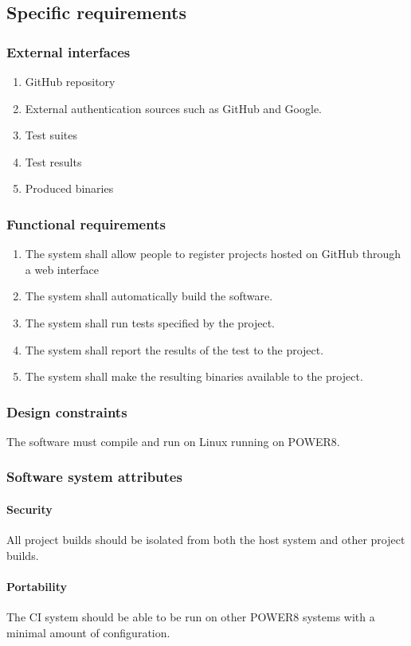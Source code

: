 \documentclass[10pt,letterpaper,onecolumn,draftclsnofoot]{IEEEtran}
\begin{document}
\subsection{Specific requirements}
\subsubsection{External interfaces}
\begin{enumerate}
\item GitHub repository
\item External authentication sources such as GitHub and Google.
\item Test suites
\item Test results
\item Produced binaries
\end{enumerate}
\subsubsection{Functional requirements}
\begin{enumerate}
\item The system shall allow people to register projects hosted on GitHub through a web interface
\item The system shall automatically build the software.
\item The system shall run tests specified by the project.
\item The system shall report the results of the test to the project.
\item The system shall make the resulting binaries available to the project.
\end{enumerate}
\subsubsection{Design constraints}
The software must compile and run on Linux running on POWER8.
\subsubsection{Software system attributes}
\paragraph{Security}
All project builds should be isolated from both the host system and other project builds.
\paragraph{Portability}
The CI system should be able to be run on other POWER8 systems with a minimal amount of configuration.
\end{document}
